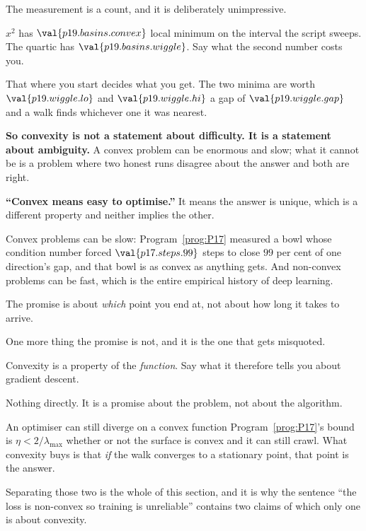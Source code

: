 \begin{fr}
The measurement is a count, and it is deliberately unimpressive.

$x^{2}$ has $\val{p19.basins.convex}$ local minimum on the interval the script
sweeps. The quartic has $\val{p19.basins.wiggle}$. Say what the second number
costs you.
\dotline
\nextframe
\end{fr}

\begin{fr}
\begin{ansblock}
That where you start decides what you get. The two minima are worth
$\val{p19.wiggle.lo}$ and $\val{p19.wiggle.hi}$ \dash{} a gap of
$\val{p19.wiggle.gap}$ \dash{} and a walk finds whichever one it was nearest.
\end{ansblock}

\textbf{So convexity is not a statement about difficulty. It is a statement
about ambiguity.} A convex problem can be enormous and slow; what it cannot be
is a problem where two honest runs disagree about the answer and both are
right.

\begin{trapbox}
\textbf{\enquote{Convex means easy to optimise.}} It means the answer is
unique, which is a different property and neither implies the other.

Convex problems can be slow: Program~\ref{prog:P17} measured a bowl whose
condition number forced $\val{p17.steps.99}$ steps to close $99$ per cent of
one direction's gap, and that bowl is as convex as anything gets. And
non-convex problems can be fast, which is the entire empirical history of
deep learning.

The promise is about \emph{which} point you end at, not about how long it
takes to arrive.
\end{trapbox}
\end{fr}

\begin{fr}
One more thing the promise is not, and it is the one that gets misquoted.

Convexity is a property of the \emph{function}. Say what it therefore tells
you about gradient descent.
\nextframe
\end{fr}

\begin{fr}
\begin{ansblock}
Nothing directly. It is a promise about the problem, not about the algorithm.
\end{ansblock}

An optimiser can still diverge on a convex function \dash{}
Program~\ref{prog:P17}'s bound is $\eta < 2/\lambda_{\max}$ whether or not
the surface is convex \dash{} and it can still crawl. What convexity buys is
that \emph{if} the walk converges to a stationary point, that point is the
answer.

Separating those two is the whole of this section, and it is why the sentence
\enquote{the loss is non-convex so training is unreliable} contains two claims
of which only one is about convexity.
\end{fr}

